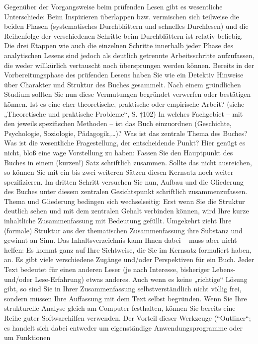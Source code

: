 \documentclass[]{book}
\theoremstyle{definition}
\theoremstyle{definition}
\theoremstyle{definition}
\theoremstyle{remark}
\begin{document}
Gegenüber der Vorgangsweise beim prüfenden Lesen gibt es wesentliche
Unterschiede: Beim Inspizieren überlappen bzw. vermischen sich teilweise
die beiden Phasen (systematisches Durchblättern und schnelles
Durchlesen) und die Reihenfolge der verschiedenen Schritte beim
Durchblättern ist relativ beliebig. Die drei Etappen wie auch die
einzelnen Schritte innerhalb jeder Phase des analytischen Lesens sind
jedoch als deutlich getrennte Arbeitsschritte aufzufassen, die weder
willkürlich vertauscht noch übersprungen werden können. Bereits in der
Vorbereitungsphase des prüfenden Lesens haben Sie wie ein Detektiv
Hinweise über Charakter und Struktur des Buches gesammelt. Nach einem
gründlichen Studium sollten Sie nun diese Vermutungen begründet
verwerfen oder bestätigen können. Ist es eine eher theoretische,
praktische oder empirische Arbeit? (siehe „Theoretische und praktische
Probleme``, S. †102) In welches Fachgebiet -- mit den jeweils
spezifischen Methoden -- ist das Buch einzuordnen (Geschichte,
Psychologie, Soziologie, Pädagogik,\ldots{})? Was ist das zentrale Thema
des Buches? Was ist die wesentliche Fragestellung, der entscheidende
Punkt? Hier genügt es nicht, bloß eine vage Vorstellung zu haben: Fassen
Sie den Hauptpunkt des Buches in einem (kurzen!) Satz schriftlich
zusammen. Sollte das nicht ausreichen, so können Sie mit ein bis zwei
weiteren Sätzen diesen Kernsatz noch weiter spezifizieren. Im dritten
Schritt versuchen Sie nun, Aufbau und die Gliederung des Buches unter
diesem zentralen Gesichtspunkt schriftlich zusammenzufassen. Thema und
Gliederung bedingen sich wechselseitig: Erst wenn Sie die Struktur
deutlich sehen und mit dem zentralen Gehalt verbinden können, wird Ihre
kurze inhaltliche Zusammenfassung mit Bedeutung gefüllt. Umgekehrt zieht
Ihre (formale) Struktur aus der thematischen Zusammenfassung ihre
Substanz und gewinnt an Sinn. Das Inhaltsverzeichnis kann Ihnen dabei --
muss aber nicht -- helfen: Es kommt ganz auf Ihre Sichtweise, die Sie im
Kernsatz formuliert haben, an. Es gibt viele verschiedene Zugänge
und/oder Perspektiven für ein Buch. Jeder Text bedeutet für einen
anderen Leser (je nach Interesse, bisheriger Lebens- und/oder
Lese-Erfahrung) etwas anderes. Auch wenn es keine „richtige`` Lösung
gibt, so sind Sie in Ihrer Zusammenfassung selbstverständlich nicht
völlig frei, sondern müssen Ihre Auffassung mit dem Text selbst
begründen. Wenn Sie Ihre strukturelle Analyse gleich am Computer
festhalten, können Sie bereits eine Reihe guter Softwarehilfen
verwenden. Der Vorteil dieser Werkzeuge (``Outliner``; es handelt sich
dabei entweder um eigenständige Anwendungsprogramme oder um Funktionen
\end{document}
